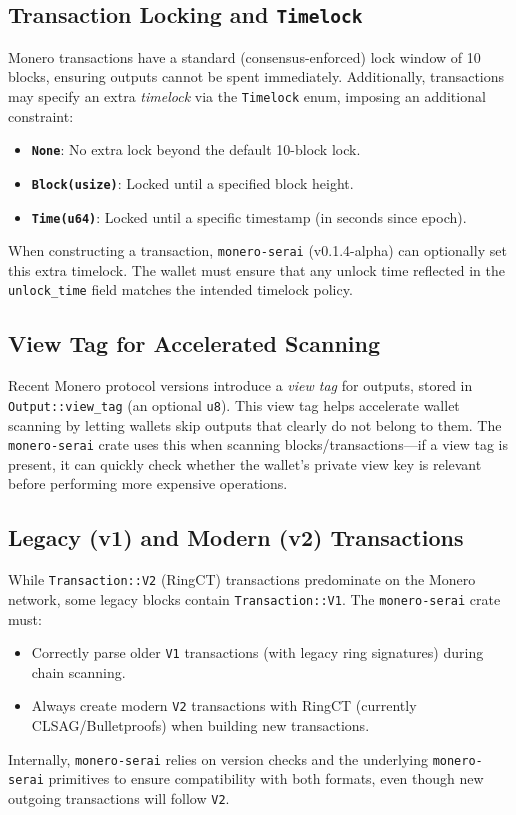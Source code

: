 \documentclass[12pt,a4paper]{article}
\begin{document}
\subsection*{Transaction Locking and \texttt{Timelock}}
Monero transactions have a standard (consensus-enforced) lock window of 10 blocks, ensuring outputs cannot be spent immediately. Additionally, transactions may specify an extra \emph{timelock} via the \texttt{Timelock} enum, imposing an additional constraint:
\begin{itemize}
\item \textbf{\texttt{None}}: No extra lock beyond the default 10-block lock.
\item \textbf{\texttt{Block(usize)}}: Locked until a specified block height.
\item \textbf{\texttt{Time(u64)}}: Locked until a specific timestamp (in seconds since epoch). \end{itemize}
When constructing a transaction, \texttt{monero-serai} (v0.1.4-alpha) can optionally set this extra timelock. The wallet must ensure that any unlock time reflected in the \texttt{unlock\_time} field matches the intended timelock policy.

\subsection*{View Tag for Accelerated Scanning}
Recent Monero protocol versions introduce a \emph{view tag} for outputs, stored in \\\texttt{Output::view\_tag} (an optional \texttt{u8}). This view tag helps accelerate wallet scanning by letting wallets skip outputs that clearly do not belong to them. The \texttt{monero-serai} crate uses this when scanning blocks/transactions—if a view tag is present, it can quickly check whether the wallet’s private view key is relevant before performing more expensive operations.

\subsection*{Legacy (v1) and Modern (v2) Transactions}
While \texttt{Transaction::V2} (RingCT) transactions predominate on the Monero network, some legacy blocks contain \texttt{Transaction::V1}. The \texttt{monero-serai} crate must:
\begin{itemize}
\item Correctly parse older \texttt{V1} transactions (with legacy ring signatures) during chain scanning.
\item Always create modern \texttt{V2} transactions with RingCT (currently CLSAG/Bulletproofs) when building new transactions.
\end{itemize}
Internally, \texttt{monero-serai} relies on version checks and the underlying \texttt{monero-serai} primitives to ensure compatibility with both formats, even though new outgoing transactions will follow \texttt{V2}.
\end{document}
